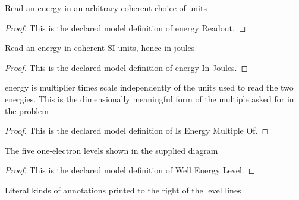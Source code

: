 \begin{definition}
  \label{def:physics:phyx-mini-0581:phyxminiproblems-problemphyxmini0581-energyreadout}
  Read an energy in an arbitrary coherent choice of units
\end{definition}
\begin{proof}
  This is the declared model definition of energy Readout.
\end{proof}
\begin{definition}
  \label{def:physics:phyx-mini-0581:phyxminiproblems-problemphyxmini0581-energyinjoules}
  Read an energy in coherent SI units, hence in joules
\end{definition}
\begin{proof}
  This is the declared model definition of energy In Joules.
\end{proof}
\begin{definition}
  \label{def:physics:phyx-mini-0581:phyxminiproblems-problemphyxmini0581-isenergymultipleof}
  energy is multiplier times scale independently of the units used to read the two energies. This is the dimensionally meaningful form of the multiple asked for in the problem
\end{definition}
\begin{proof}
  This is the declared model definition of Is Energy Multiple Of.
\end{proof}
\begin{definition}
  \label{def:physics:phyx-mini-0581:phyxminiproblems-problemphyxmini0581-wellenergylevel}
  The five one-electron levels shown in the supplied diagram
\end{definition}
\begin{proof}
  This is the declared model definition of Well Energy Level.
\end{proof}
\begin{definition}
  \label{def:physics:phyx-mini-0581:phyxminiproblems-problemphyxmini0581-printedlevelannotation}
  Literal kinds of annotations printed to the right of the level lines
\end{definition}
